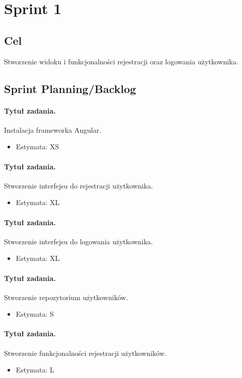 ﻿\documentclass[a4paper]{article}
\begin{document}
\section{Sprint 1}
\subsection{Cel} Stworzenie widoku i funkcjonalności rejestracji oraz logowania	użytkownika.
\subsection{Sprint Planning/Backlog}

\paragraph{Tytuł zadania.} Instalacja frameworka Angular.
\begin{itemize}
\item Estymata: XS
\end{itemize}

\paragraph{Tytuł zadania.} Stworzenie interfejsu do rejestracji użytkownika.
\begin{itemize}
\item Estymata: XL
\end{itemize}

\paragraph{Tytuł zadania.} Stworzenie interfejsu do logowania użytkownika.
\begin{itemize}
\item Estymata: XL
\end{itemize}

\paragraph{Tytuł zadania.} Stworzenie repozytorium użytkowników.
\begin{itemize}
\item Estymata: S
\end{itemize}

\paragraph{Tytuł zadania.} Stworzenie funkcjonalności rejestracji użytkowników.
\begin{itemize}
\item Estymata: L
\end{itemize}
\end{document}
